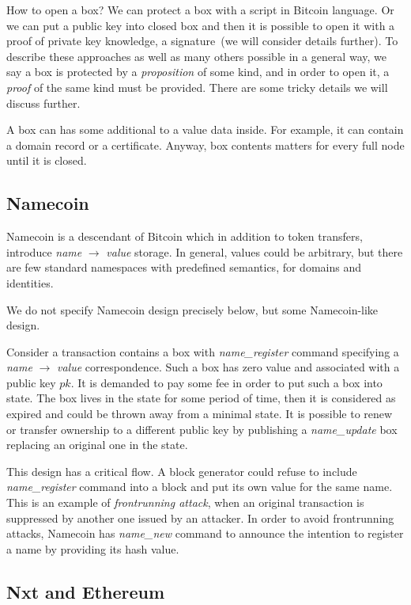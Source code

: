 \documentclass[]{report}   %
\begin{document}
How to open a box? We can protect a box with a script in Bitcoin language. Or we can put a public key into closed box and then it is possible to open it with a proof of private key knowledge, a signature~(we will consider details further). To describe these approaches as well as many others possible in a general way, we say a box is protected by a \textit{proposition} of some kind, and in order to open it, a \textit{proof} of the same kind must be provided. There are some tricky details we will discuss further.

A box can has some additional to a value data inside. For example, it can contain a domain record or a certificate. Anyway, box contents matters for every full node until it is closed. 

\subsection{Namecoin}

Namecoin is a descendant of Bitcoin which in addition to token transfers, introduce \textit{name} $\rightarrow$ \textit{value} storage. In general, values could be arbitrary, but there are few  standard namespaces with predefined semantics, for domains and identities.

We do not specify Namecoin design precisely below, but some Namecoin-like design. 

Consider a transaction contains a box with \textit{name\_register} command specifying a \textit{name} $\rightarrow$ \textit{value} correspondence. Such a box has zero value and associated with a public key \(pk\). It is demanded to pay some fee in order to put such a box into state. The box lives in the state for some period of time, then it is considered as expired and could be thrown away from a minimal state. It is possible to renew or transfer ownership to a different public key by publishing a \textit{name\_update} box replacing an original one in the state.

This design has a critical flow. A block generator could refuse to include \textit{name\_register} command into a block and put its own value for the same name. This is an example of \textit{frontrunning attack}, when an original transaction is suppressed by another one issued by an attacker. In order to avoid frontrunning attacks, Namecoin has \textit{name\_new} command to announce the intention to register a name by providing its hash value.


\subsection{Nxt and Ethereum}	
\end{document}
